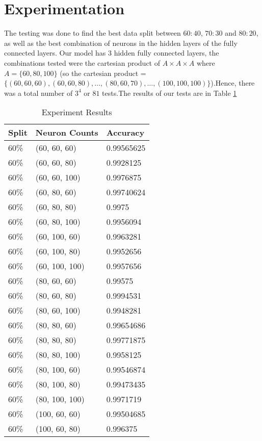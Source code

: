 \documentclass[conference]{IEEEtran}
\begin{document}
\section{Experimentation}
The testing was done to find the best data split between $60:40$, $70:30$ and $80:20$, as well as the best combination of neurons in the hidden layers of the fully connected layers. Our model has 3 hidden fully connected layers, the combinations tested were the cartesian product of $A \times A \times A$ where $A = \{60, 80, 100\}$ (so the cartesian product = $\{(60, 60, 60), (60, 60, 80), \ldots, (80, 60, 70), \ldots, (100, 100, 100)\}$).\@ Hence, there was a total number of $3^4$ or $81$ tests.\@ The results of our tests are in Table \ref{tab:experiments}
\begin{table}
    \scriptsize
    \caption{Experiment Results}\label{tab:experiments}
    \begin{tabularx}{\columnwidth}{lXl}
    \toprule
    \textbf{Split} & \textbf{Neuron Counts} & \textbf{Accuracy}\\
    \midrule
    60\% & (60, 60, 60) & 0.99565625\\
    60\% & (60, 60, 80) & 0.9928125\\
    60\% & (60, 60, 100) & 0.9976875\\
    60\% & (60, 80, 60) & 0.99740624\\
    60\% & (60, 80, 80) & 0.9975\\
    60\% & (60, 80, 100) & 0.9956094\\
    60\% & (60, 100, 60) & 0.9963281\\
    60\% & (60, 100, 80) & 0.9952656\\
    60\% & (60, 100, 100) & 0.9957656\\
    60\% & (80, 60, 60) & 0.99575\\
    60\% & (80, 60, 80) & 0.9994531\\
    60\% & (80, 60, 100) & 0.9948281\\
    60\% & (80, 80, 60) & 0.99654686\\
    60\% & (80, 80, 80) & 0.99771875\\
    60\% & (80, 80, 100) & 0.9958125\\
    60\% & (80, 100, 60) & 0.99546874\\
    60\% & (80, 100, 80) & 0.99473435\\
    60\% & (80, 100, 100) & 0.9971719\\
    60\% & (100, 60, 60) & 0.99504685\\
    60\% & (100, 60, 80) & 0.996375\\

\end{tabularx}
\end{table}
\end{document}
